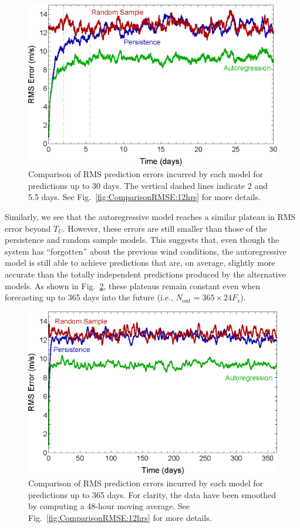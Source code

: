 \documentclass[11pt, oneside]{article}
\newcommand{\figref}[1]{Fig.~\ref{#1}}
\begin{document}
\begin{figure}[htb]
\centering
\includegraphics[width=0.7\columnwidth]{figures/ComparisonRMSPredictionError_30days}
\caption{Comparison of RMS prediction errors incurred by each model for predictions up to 30 days.
The vertical dashed lines indicate 2 and 5.5 days.
See \figref{fig:ComparisonRMSE:12hrs} for more details.}
\label{fig:ComparisonRMSE:30days}
\end{figure}

Similarly, we see that the autoregressive model reaches a similar plateau in RMS error beyond $T_U$.
However, these errors are still smaller than those of the persistence and random sample models.
This suggests that, even though the system has ``forgotten'' about the previous wind conditions, the autoregressive model is still able to achieve predictions that are, on average, slightly more accurate than the totally independent predictions produced by the alternative models.
As shown in \figref{fig:ComparisonRMSE:365days}, these plateaus remain constant even when forecasting up to 365 days into the future (i.e., $N_\text{out} = 365 \times 24 F_s$).

\begin{figure}[htb]
\centering
\includegraphics[width=0.7\columnwidth]{figures/ComparisonRMSPredictionError_365days}
\caption{Comparison of RMS prediction errors incurred by each model for predictions up to 365 days.
For clarity, the data have been smoothed by computing a 48-hour moving average.
See \figref{fig:ComparisonRMSE:12hrs} for more details.}
\label{fig:ComparisonRMSE:365days}
\end{figure}
\end{document}
